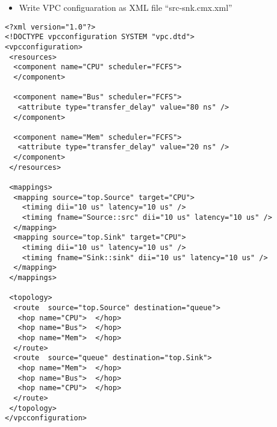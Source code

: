 \begin{frame}[fragile=singleslide]
\begin{itemize}
\item Write VPC configuaration as XML file ``src-snk.cmx.xml''
\end{itemize}

\begin{lstlisting}
<?xml version="1.0"?>
<!DOCTYPE vpcconfiguration SYSTEM "vpc.dtd">
<vpcconfiguration>
 <resources>
  <component name="CPU" scheduler="FCFS">
  </component>

  <component name="Bus" scheduler="FCFS">
   <attribute type="transfer_delay" value="80 ns" />
  </component>

  <component name="Mem" scheduler="FCFS">
   <attribute type="transfer_delay" value="20 ns" />
  </component>
 </resources>

 <mappings>
  <mapping source="top.Source" target="CPU">
    <timing dii="10 us" latency="10 us" />
    <timing fname="Source::src" dii="10 us" latency="10 us" />
  </mapping>
  <mapping source="top.Sink" target="CPU">
    <timing dii="10 us" latency="10 us" />
    <timing fname="Sink::sink" dii="10 us" latency="10 us" />
  </mapping>
 </mappings>

 <topology>
  <route  source="top.Source" destination="queue">
   <hop name="CPU">  </hop>
   <hop name="Bus">  </hop>
   <hop name="Mem">  </hop>
  </route>
  <route  source="queue" destination="top.Sink">
   <hop name="Mem">  </hop>
   <hop name="Bus">  </hop>
   <hop name="CPU">  </hop>
  </route>
 </topology>
</vpcconfiguration>

\end{lstlisting}
\end{frame}

